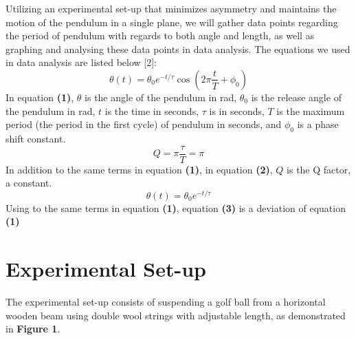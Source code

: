 \documentclass{article}
\begin{document}
\noindent Utilizing an experimental set-up that minimizes asymmetry and maintains the motion of the pendulum in a single plane, we will gather data points regarding the period of pendulum with regards to both angle and length, as well as graphing and analysing these data points in data analysis. The equations we used in data analysis are listed below [2]: 
\begin{equation}
 \theta(t) = \theta_0 e^{-t/\tau} \cos(2\pi \frac{t}{T}+\phi_0)
\end{equation}
In equation \textbf{(1)}, $\theta$ is the angle of the pendulum in rad,  $\theta_0$ is the release angle of the pendulum in rad, $t$ is the time in seconds, $\tau$ is in seconds, $T$ is the maximum period (the period in the first cycle) of pendulum in seconds, and $\phi_0$ is a phase shift constant. 
\begin{equation}
 Q=\pi \frac{\tau}{T}=\pi
\end{equation}
In addition to the same terms in equation \textbf{(1)}, in equation \textbf{(2)}, $Q$ is the Q factor, a constant.
\begin{equation}
 \theta(t) = \theta_0 e^{-t/\tau} 
\end{equation}
Using to the same terms in equation \textbf{(1)}, equation \textbf{(3)} is a deviation of equation \textbf{(1)}

\section{Experimental Set-up}

The experimental set-up consists of suspending a golf ball from a horizontal wooden beam using double wool strings with adjustable length, as demonstrated in \textbf{Figure 1}.
\end{document}
